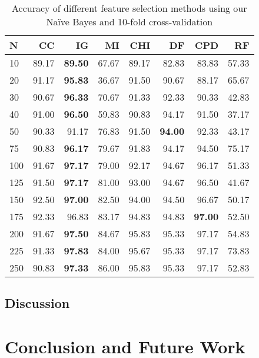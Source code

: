 \documentclass[10pt, a4paper]{article}
\begin{document}
\begin{table}[H]
\centering
\caption{Accuracy of different feature selection methods using our Na\"ive Bayes and 10-fold cross-validation}
\begin{tabular}{@{}l rrr rrrr@{}}
\toprule
\textbf{N} & \textbf{CC} & \textbf{IG} & \textbf{MI} & \textbf{CHI} & \textbf{DF} & \textbf{CPD} & \textbf{RF} \\
\midrule
10 & 89.17 & \textbf{89.50} & 67.67 & 89.17 & 82.83 & 83.83 & 57.33 \\
20 & 91.17 & \textbf{95.83} & 36.67 & 91.50 & 90.67 & 88.17 & 65.67 \\
30 & 90.67 & \textbf{96.33} & 70.67 & 91.33 & 92.33 & 90.33 & 42.83 \\ 
40 & 91.00 & \textbf{96.50} & 59.83 & 90.83 & 94.17 & 91.50 & 37.17 \\
50 & 90.33 & 91.17 & 76.83 & 91.50 & \textbf{94.00} & 92.33 & 43.17 \\ 
75 & 90.83 & \textbf{96.17} & 79.67 & 91.83 & 94.17 & 94.50 & 75.17 \\ 
100 & 91.67 & \textbf{97.17} & 79.00 & 92.17 & 94.67 & 96.17 & 51.33 \\
125 & 91.50 & \textbf{97.17} & 81.00 & 93.00 & 94.67 & 96.50 & 41.67 \\
150 & 92.50 & \textbf{97.00} & 82.50 & 94.00 & 94.50 & 96.67 & 50.17 \\
175 & 92.33 & 96.83 & 83.17 & 94.83 & 94.83 & \textbf{97.00} & 52.50 \\
200 & 91.67 & \textbf{97.50} & 84.67 & 95.83 & 95.33 & 97.17 & 54.83 \\
225 & 91.33 & \textbf{97.83} & 84.00 & 95.67 & 95.33 & 97.17 & 73.83 \\
250 & 90.83 & \textbf{97.33} & 86.00 & 95.83 & 95.33 & 97.17 & 52.83 \\
\bottomrule
\end{tabular}
\label{table:diffbody}
\end{table}

\subsection{Discussion}

\section{Conclusion and Future Work}

\end{document}
